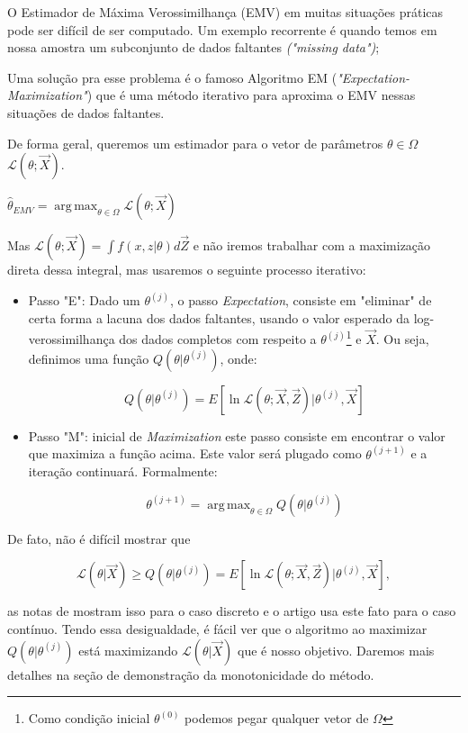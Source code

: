 \documentclass[12pt]{article}
\newcommand{\lik}{\mathcal{L}}
\DeclareMathOperator*{\argmax}{arg\,max} %
\begin{document}
O Estimador de Máxima Verossimilhança (EMV) em muitas situações práticas pode ser difícil de ser computado. Um exemplo recorrente é quando temos em nossa amostra um subconjunto de dados faltantes \textit{("missing data")}; 

Uma solução pra esse problema é o famoso Algoritmo EM\cite{degroot2012probability}\cite{wiki_exp} (\textit{"Expectation-Maximization"}) que é uma método iterativo para aproxima o EMV nessas situações de dados faltantes.

De forma geral, queremos um estimador para o vetor de parâmetros $\theta\in\Omega$ $\lik (\theta;\vec X)$.

$\displaystyle\hat{\theta}_{EMV}=\argmax_{\theta \in \Omega} \lik (\theta;\vec X)$

Mas $\displaystyle\lik (\theta;\vec X) = \int f(x,z|\theta)d\vec Z$ e não iremos trabalhar com a maximização direta dessa integral, mas usaremos o seguinte processo iterativo:


\begin{itemize}
    \item Passo "E": Dado um $\theta^{(j)}$, o passo \textit{Expectation}, consiste em "eliminar" de certa forma a lacuna dos dados faltantes, usando o valor esperado da log-verossimilhança dos dados completos com respeito a $\theta^{(j)}$\footnote{Como condição inicial $\theta^{(0)}$ podemos pegar qualquer vetor de $\Omega$} e $\vec X$. Ou seja, definimos uma função $Q(\theta|\theta^{(j)})$, onde:
    
    $$Q(\theta|\theta^{(j)})=E[\ln \lik (\theta;\vec X, \vec Z)|\theta^{(j)},\vec X]$$
    
    \item Passo "M": inicial de \textit{Maximization} este passo consiste em encontrar o valor que maximiza a função acima. Este valor será plugado como $\theta^{(j+1)}$ e a iteração continuará. Formalmente:\cite{wiki_exp}
    
    $$\theta^{(j+1)}=\argmax_{\theta\in\Omega}Q(\theta|\theta^{(j)})$$
    
\end{itemize}


De fato, não é difícil mostrar que 

$$\lik(\theta|\vec X)\geq Q(\theta|\theta^{(j)}) = E[\ln \lik (\theta;\vec X, \vec Z)|\theta^{(j)},\vec X],$$

as notas de \cite{bin} mostram isso para o caso discreto e o artigo \cite{singh2005algorithm} usa este fato para o caso contínuo. Tendo essa desigualdade, é fácil ver que o algoritmo ao maximizar $Q(\theta|\theta^{(j)})$ está maximizando $\lik(\theta|\vec X)$ que é nosso objetivo. Daremos mais detalhes na seção de demonstração da monotonicidade do método.
\end{document}
